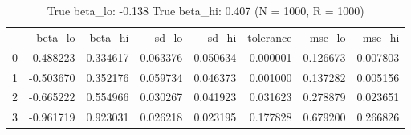 \begin{table}
\caption{True beta_lo: -0.138 True beta_hi: 0.407 (N = 1000, R = 1000)}
\begin{tabular}{lrrrrrrr}
 & beta_lo & beta_hi & sd_lo & sd_hi & tolerance & mse_lo & mse_hi \\
0 & -0.488223 & 0.334617 & 0.063376 & 0.050634 & 0.000001 & 0.126673 & 0.007803 \\
1 & -0.503670 & 0.352176 & 0.059734 & 0.046373 & 0.001000 & 0.137282 & 0.005156 \\
2 & -0.665222 & 0.554966 & 0.030267 & 0.041923 & 0.031623 & 0.278879 & 0.023651 \\
3 & -0.961719 & 0.923031 & 0.026218 & 0.023195 & 0.177828 & 0.679200 & 0.266826 \\
\end{tabular}
\end{table}
